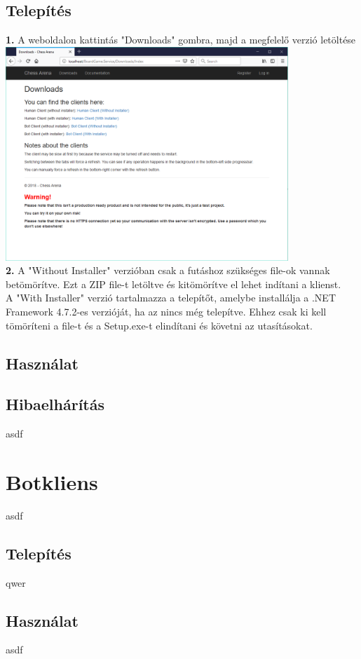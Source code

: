 \documentclass[twoside, a4paper, 12pt]{article}
\begin{document}
\subsection{Telepítés}
\noindent \textbf{1.} A weboldalon kattintás "Downloads" gombra, majd a megfelelő verzió letöltése \\
\includegraphics[width=0.8\textwidth]{img/service_downloads.png} \\
\noindent \textbf{2.} A "Without Installer" verzióban csak a futáshoz szükséges file-ok vannak betömörítve. Ezt a ZIP file-t letöltve és kitömörítve el lehet indítani a klienst. \\
A "With Installer" verzió tartalmazza a telepítőt, amelybe installálja a .NET Framework 4.7.2-es verzióját, ha az nincs még telepítve. Ehhez csak ki kell tömöríteni a file-t és a Setup.exe-t elindítani és követni az utasításokat.
\subsection{Használat}

\subsection{Hibaelhárítás}
asdf

\section{Botkliens}
asdf
\subsection{Telepítés}
qwer
\subsection{Használat}
asdf
\end{document}
